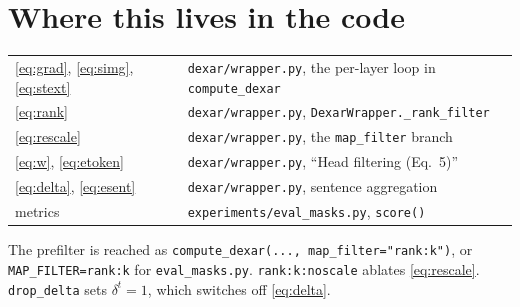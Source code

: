\documentclass[11pt]{article}
\begin{document}
\section{Where this lives in the code}

\begin{tabular}{@{}ll@{}}
\toprule
\eqref{eq:grad}, \eqref{eq:simg}, \eqref{eq:stext} & \texttt{dexar/wrapper.py}, the per-layer loop in \texttt{compute\_dexar} \\
\eqref{eq:rank}                                    & \texttt{dexar/wrapper.py}, \texttt{DexarWrapper.\_rank\_filter} \\
\eqref{eq:rescale}                                 & \texttt{dexar/wrapper.py}, the \texttt{map\_filter} branch \\
\eqref{eq:w}, \eqref{eq:etoken}                    & \texttt{dexar/wrapper.py}, ``Head filtering (Eq.~5)'' \\
\eqref{eq:delta}, \eqref{eq:esent}                 & \texttt{dexar/wrapper.py}, sentence aggregation \\
metrics                                            & \texttt{experiments/eval\_masks.py}, \texttt{score()} \\
\bottomrule
\end{tabular}

\medskip
\noindent The prefilter is reached as
\texttt{compute\_dexar(..., map\_filter="rank:k")}, or \texttt{MAP\_FILTER=rank:k}
for \texttt{eval\_masks.py}. \texttt{rank:k:noscale} ablates \eqref{eq:rescale}.
\texttt{drop\_delta} sets $\delta^{t} = 1$, which switches off \eqref{eq:delta}.
\end{document}
